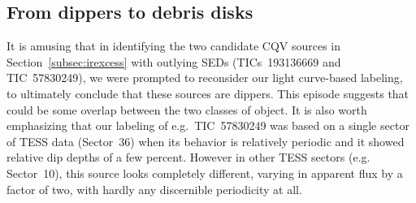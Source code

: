 \documentclass[11pt,twocolumn,tighten]{aastex63}
\begin{document}




\subsection{From dippers to debris disks}
\label{subsec:discdippers}

It is amusing that in identifying the two candidate CQV sources in
Section~\ref{subsec:irexcess} with outlying SEDs (TICs~193136669 and
TIC~57830249), we were prompted to reconsider our light curve-based
labeling, to
ultimately conclude that these sources are dippers.  This episode
suggests that could be some overlap between the two classes of
object.  It is also worth emphasizing that our labeling of
e.g.~TIC~57830249 was based on a single sector of TESS data
(Sector~36) when its behavior is relatively periodic and it showed
relative dip depths of a few percent.  However in other TESS sectors
(e.g. Sector~10), this source looks completely different, varying in
apparent flux by a factor of two, with hardly any discernible
periodicity at all.
\end{document}
